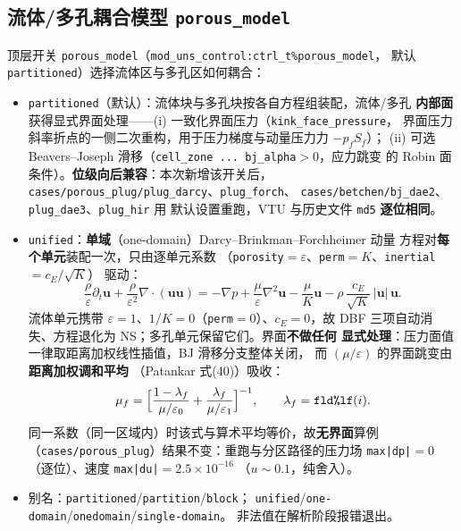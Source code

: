 \subsection{流体/多孔耦合模型 \texttt{porous\_model}}\label{app:porous-model}

顶层开关 \texttt{porous\_model}（\texttt{mod\_uns\_control:ctrl\_t\%porous\_model}，
默认 \texttt{partitioned}）选择流体区与多孔区如何耦合：

\begin{itemize}\itemsep2pt
  \item \texttt{partitioned}（默认）：流体块与多孔块按各自方程组装配，流体/多孔
        \textbf{内部面}获得显式界面处理——(i) 一致化界面压力（\texttt{kink\_face\_pressure}，
        界面压力斜率折点的一侧二次重构，用于压力梯度与动量压力力 $-p_f S_f$）；
        (ii) 可选 Beavers--Joseph 滑移（\texttt{cell\_zone ... bj\_alpha}$>0$，应力跳变
        的 Robin 面条件）。\textbf{位级向后兼容}：本次新增该开关后，
        \texttt{cases/porous\_plug/plug\_darcy}、\texttt{plug\_forch}、
        \texttt{cases/betchen/bj\_dae2}、\texttt{plug\_dae3}、\texttt{plug\_hir} 用
        默认设置重跑，VTU 与历史文件 \texttt{md5} \textbf{逐位相同}。
  \item \texttt{unified}：\textbf{单域}（one-domain）Darcy--Brinkman--Forchheimer 动量
        方程对\textbf{每个单元}装配一次，只由逐单元系数
        （\texttt{porosity}$=\varepsilon$、\texttt{perm}$=K$、\texttt{inertial}$=c_E/\sqrt K$）
        驱动：
        \[
          \frac{\rho}{\varepsilon}\partial_t \mathbf{u}
          + \frac{\rho}{\varepsilon^{2}}\nabla\!\cdot\!(\mathbf{uu})
          = -\nabla p + \frac{\mu}{\varepsilon}\nabla^{2}\mathbf{u}
          - \frac{\mu}{K}\mathbf{u}
          - \rho\,\frac{c_E}{\sqrt K}\,|\mathbf{u}|\,\mathbf{u}.
        \]
        流体单元携带 $\varepsilon=1$、$1/K=0$（\texttt{perm}$=0$）、$c_E=0$，故
        DBF 三项自动消失、方程退化为 NS；多孔单元保留它们。界面\textbf{不做任何
        显式处理}：压力面值一律取距离加权线性插值，BJ 滑移分支整体关闭，
        而 $(\mu/\varepsilon)$ 的界面跳变由\textbf{距离加权调和平均}
        （Patankar 式(40)）吸收：
        \[
          \mu_f = \Bigl[\frac{1-\lambda_f}{\mu/\varepsilon_0}
                        + \frac{\lambda_f}{\mu/\varepsilon_1}\Bigr]^{-1},
          \qquad \lambda_f = \texttt{fld\%lf}(i).
        \]
        同一系数（同一区域内）时该式与算术平均等价，故\textbf{无界面}算例
        （\texttt{cases/porous\_plug}）结果不变：重跑与分区路径的压力场
        \texttt{max|dp|}$=0$（逐位）、速度 \texttt{max|du|}$=2.5\times10^{-16}$
        （$u\sim0.1$，纯舍入）。
  \item 别名：\texttt{partitioned}/\texttt{partition}/\texttt{block}；
        \texttt{unified}/\texttt{one-domain}/\texttt{onedomain}/\texttt{single-domain}。
        非法值在解析阶段报错退出。
\end{itemize}


